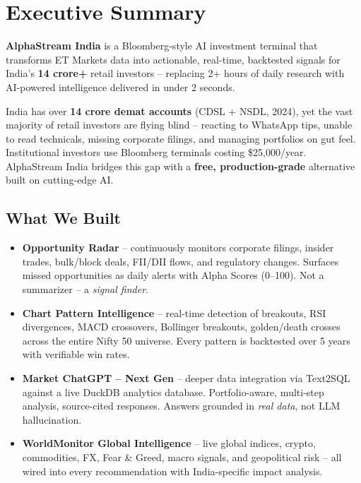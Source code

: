 \documentclass[11pt, a4paper]{article}
\begin{document}
\tableofcontents
\newpage

\section{Executive Summary}

\begin{infobox}[title={One-Line Pitch}]
\textbf{AlphaStream India} is a Bloomberg-style AI investment terminal that transforms
ET Markets data into actionable, real-time, backtested signals for India's
\textbf{14 crore+} retail investors -- replacing 2+ hours of daily research with
AI-powered intelligence delivered in under 2 seconds.
\end{infobox}

\medskip

India has over \textbf{14 crore demat accounts} (CDSL + NSDL, 2024), yet the vast majority
of retail investors are flying blind -- reacting to WhatsApp tips, unable to read technicals,
missing corporate filings, and managing portfolios on gut feel. Institutional investors use
Bloomberg terminals costing \$25,000/year. AlphaStream India bridges this gap with a
\textbf{free, production-grade} alternative built on cutting-edge AI.

\subsection*{What We Built}

\begin{itemize}[leftmargin=1.6em, itemsep=3pt]
  \item \textbf{Opportunity Radar} -- continuously monitors corporate filings, insider trades,
        bulk/block deals, FII/DII flows, and regulatory changes. Surfaces missed opportunities
        as daily alerts with Alpha Scores (0--100). Not a summarizer -- a \emph{signal finder}.
  \item \textbf{Chart Pattern Intelligence} -- real-time detection of breakouts, RSI divergences,
        MACD crossovers, Bollinger breakouts, golden/death crosses across the entire Nifty 50
        universe. Every pattern is backtested over 5 years with verifiable win rates.
  \item \textbf{Market ChatGPT -- Next Gen} -- deeper data integration via Text2SQL against
        a live DuckDB analytics database. Portfolio-aware, multi-step analysis, source-cited
        responses. Answers grounded in \emph{real data}, not LLM hallucination.
  \item \textbf{WorldMonitor Global Intelligence} -- live global indices, crypto, commodities,
        FX, Fear \& Greed, macro signals, and geopolitical risk -- all wired into every
        recommendation with India-specific impact analysis.
\end{itemize}
\end{document}
